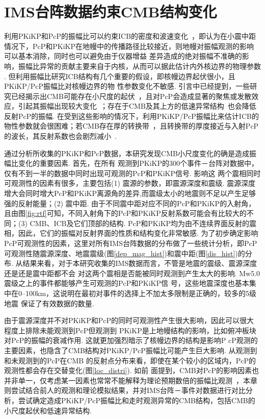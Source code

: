 \chapter{IMS台阵数据约束CMB结构变化}

利用PKiKP和PcP的振幅比可以约束ICB的密度和波速变化~\citep{Koper2004a}，即认为在小震中距情况下，PcP和PKiKP在地幔中的传播路径比较接近，则地幔对振幅观测的影响可以基本消除，同时也可以避免由于仪器增益
差异造成的绝对振幅不准确的影响，振幅比异常的贡献主要来自于内核，从而可以据此估计内外核边界的物理参数
. 但利用振幅比研究ICB结构有几个重要的假设，即核幔边界起伏很小，且PKiKP/PcP振幅比对核幔边界的物
性参数变化不敏感. 引言中已经提到，一些研究已经揭示出CMB可能存在小尺度的起伏~\citep{Rost2004a}，且对PcP会造成显著的聚焦或发散效应，引起其振幅出现较大变化~\citep{Wu2014a,Shen2016}；存在于CMB及其上方的低速异常结构~\citep{He2009}也会降低反射PcP的振幅. 在受到这些影响的情况下，利用PKiKP/PcP振幅比来估计ICB的物性参数就会很困难；若CMB存在厚的转换带~\citep{Garnero2000}，且转换带的厚度接近与入射PcP的波长，其反射系数也会剧烈减小~\citep{Richards1972}. 

通过分析所收集的PKiKP和PcP数据，本研究发现CMB小尺度变化的确是造成振幅比变化的重要因素. 首先，在所有
观测到PKiKP的300个事件－台阵对数据中，仅有不到一半的数据中同时出现可观测的PcP和PKiKP信号. 影响这
两个震相同时可观测性的因素有很多，主要包括(1) 震源的参数，即震源深度和震级. 震源深度增大会同时增大PcP和PKiKP离源角的差异,而震级太小的地震则不足以产生足够强的反射能量；(2) 震中距. 由于不同震中距对应不同的PcP和PKiKP的入射角，且由图\ref{fig:rtf}可知，不同入射角下的PcP和PKiKP反射系数可能会有比较大的不同；(3) CMB、ICB及它们顶部的结构. PcP和PKiKP均为由不连续界面反射的震相，因此，它们的振幅对反射界面的性质和结构变化非常敏感. 为了初步确定影响PcP可观测性的因素，这里对所有IMS台阵数据的分布做了一些统计分析，即PcP可观测性随震源深度、地震震级(图\ref{dep_mag_hist})和震中距(图\ref{dis_hist})的分布. 从结果来看，对于本研究收集的IMS数据而言，不管是地震的震级、震源深度还是还是震中距都不会
对这两个震相是否能被同时观测到产生太大的影响. Mw5.0震级之上的事件都能够产生可观测的PcP和PKiKP信
号，这些地震深度也基本集中在0--100km，这说明在最初对事件的选择上不加太多限制是正确的，较多的5级地震
保证了有效数据的数量. 

由于震源深度并不对PKiKP和PcP的同时可观测性产生很大影响，因此可以很大程度上排除未能观测到PcP但观测到
PKiKP是上地幔结构的影响，比如俯冲板块对PcP的振幅的衰减作用. 这就更加强烈暗示了核幔边界的结构是影响P
cP观测的主要因素，也隐含了CMB结构对PKiKP/PcP振幅比可能产生巨大影响. 从观测到和未观测到的PcP在CMB
的反射点分布来看，即使在某个较小的区域内，PcP的观测性都会存在交替变化(图\ref{loc_distri}). 如前
面提到，CMB对PcP的影响因素也并非单一，仅考虑某一因素也常常不能解释为理论预期数倍的振幅比观测~\citep{Koper2004a}，本章则尝试结合前人的观测和理论模拟结果，并对IMS台阵－事件对数据进行对比分析，尝试确定造成PKiKP/PcP振幅比和走时观测异常的CMB结构，包括CMB的小尺度起伏和低速异常结构. 

